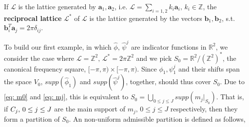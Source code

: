 \begin{mydef}
If $\mathcal{L}$ is the lattice generated by $\boldsymbol{a}_1,\boldsymbol{a}_2$, i.e. $\mathcal{L} = \sum_{i=1,2}k_i\boldsymbol{a}_i,\,k_i\in\mathbb{Z}$,
the {\bf reciprocal lattice} $\mathcal{L}^*$ of $\mathcal{L}$ is the lattice generated by the vectors $\boldsymbol{b}_1,\boldsymbol{b}_2$, s.t. $\boldsymbol{b}_i^T\boldsymbol{a}_j = 2\pi\delta_{ij}$. 

\end{mydef}

To build our first example, in which $\hat{\phi},\,\widehat{\psi}^j$ are indicator functions in $\mathbb{R}^2$, we consider the case where $\mathcal{L} = \mathbb{Z}^2,\,\mathcal{L}^* = 2\pi\mathbb{Z}^2$ and we pick
$S_0=\mathbb{R}^2/(\mathbb{Z}^2)^*$, the canonical frequency square, $[-\pi,\pi)\times[-\pi,\pi)$. 
Since $\phi_1,\psi^j_1$ and their shifts span the space $V_0$, $supp(\widehat{\phi}_1)$ and $supp(\widehat{\psi}^j)$, together, should thus cover $S_0$. Due to \eqref{eq: m0} and \eqref{eq: mj}, this is equivalent to $S_0=\bigcup_{0\leq j\leq J} supp(m_j\vert_{S_0})$. That is, if $C_j,\,{\small 0\leq j\leq J}$ are the main support of $m_j,\,0\leq j\leq J$ respectively, then they form a partition of $S_0$. An non-uniform admissible partition is defined as follows,


